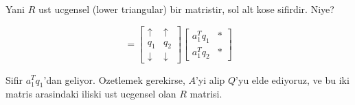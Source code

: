 \documentclass[12pt,fleqn]{article}\usepackage{../common}
\begin{document}
Yani $R$ ust ucgensel (lower triangular) bir matristir, sol alt kose
sifirdir. Niye? 

\[ 
=
\left[\begin{array}{rrr}
\uparrow &  \uparrow \\
q_1 &  q_2 \\
\downarrow &  \downarrow 
\end{array}\right]
\left[\begin{array}{rrr}
a_1^Tq_1 &  * \\
a_1^Tq_2 &  *
\end{array}\right]
 \]

Sifir $a_1^Tq_1$'dan geliyor. Ozetlemek gerekirse, $A$'yi alip $Q$'yu elde
ediyoruz, ve bu iki matris arasindaki iliski ust ucgensel olan $R$
matrisi. 
\end{document}
